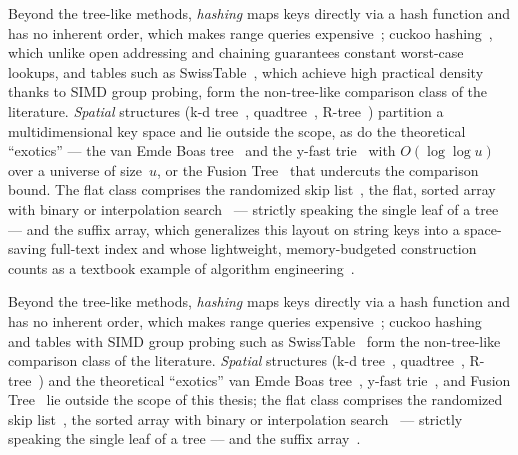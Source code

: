 \begin{nurlang}
Beyond the tree-like methods, \emph{hashing} maps keys directly via a hash function and has no inherent
order, which makes range queries expensive~\cite{knuth1998taocp3}; cuckoo hashing~\cite{pagh2004cuckoo},
which unlike open addressing and chaining guarantees constant worst-case lookups, and tables such as
SwissTable~\cite{abseil_swisstable}, which achieve high practical density thanks to SIMD group probing,
form the non-tree-like comparison class of the
literature\@. \emph{Spatial} structures (k-d tree~\cite{bentley1975kdtree},
quadtree~\cite{finkel1974quadtree}, R-tree~\cite{guttman1984rtree}) partition a multidimensional key
space and lie outside the scope, as do the theoretical \enquote{exotics} --- the van Emde Boas
tree~\cite{vanemdeboas1975} and the y-fast trie~\cite{willard1983yfast} with $O(\log\log u)$ over a
universe of size~$u$, or the Fusion Tree~\cite{fredman1993fusion} that undercuts the comparison
bound\@. The flat class comprises the randomized skip list~\cite{pugh1990skiplist}, the flat, sorted
array with binary or interpolation search~\cite{knuth1998taocp3} --- strictly speaking the single leaf
of a tree --- and the suffix array, which generalizes this layout on string keys into a space-saving
full-text index and whose lightweight, memory-budgeted construction counts as a textbook example of
algorithm engineering~\cite{manzini2002suffixarray}.
\end{nurlang}
\begin{nurkurz}
Beyond the tree-like methods, \emph{hashing} maps keys directly via a hash function and has no inherent order,
which makes range queries expensive~\cite{knuth1998taocp3}; cuckoo hashing~\cite{pagh2004cuckoo} and tables
with SIMD group probing such as SwissTable~\cite{abseil_swisstable} form the non-tree-like comparison class of
the literature\@. \emph{Spatial} structures (k-d tree~\cite{bentley1975kdtree}, quadtree~\cite{finkel1974quadtree},
R-tree~\cite{guttman1984rtree}) and the theoretical \enquote{exotics} van Emde Boas tree~\cite{vanemdeboas1975},
y-fast trie~\cite{willard1983yfast}, and Fusion Tree~\cite{fredman1993fusion} lie outside the scope of this
thesis; the flat class comprises the randomized skip list~\cite{pugh1990skiplist}, the sorted array with binary
or interpolation search~\cite{knuth1998taocp3} --- strictly speaking the single leaf of a tree --- and the
suffix array~\cite{manzini2002suffixarray}.
\end{nurkurz}

